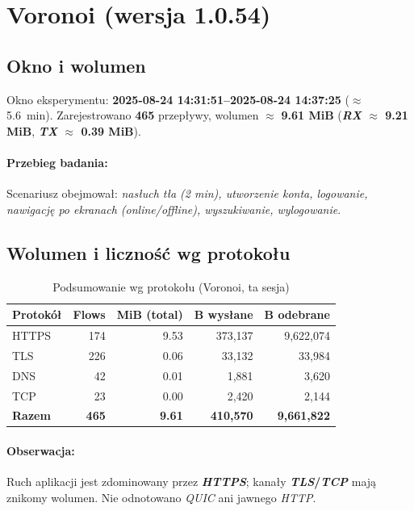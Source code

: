 \section{Voronoi (wersja 1.0.54)}
\label{sec:voronoi}

\subsection*{Okno i wolumen}
Okno eksperymentu: \textbf{2025-08-24 14{:}31{:}51–2025-08-24 14{:}37{:}25} ($\approx$ \SI{5.6}{\minute}). 
Zarejestrowano \textbf{465} przepływy, wolumen $\approx$ \textbf{9.61 MiB} 
(\textbf{\emph{RX} $\approx$ 9.21 MiB}, \textbf{\emph{TX} $\approx$ 0.39 MiB}).

\paragraph{Przebieg badania:} 
Scenariusz obejmował: \emph{nasłuch tła (2 min), utworzenie konta, logowanie, nawigację po ekranach (online/offline), wyszukiwanie, wylogowanie}.

\subsection{Wolumen i liczność wg protokołu}
\begin{table}[H]
  \centering
  \caption{Podsumowanie wg protokołu (Voronoi, ta sesja)}
  \label{tab:voronoi-proto}
  \begin{tabular}{lrrrr}
    \toprule
    \textbf{Protokół} & \textbf{Flows} & \textbf{MiB (total)} & \textbf{B wysłane} & \textbf{B odebrane} \\
    \midrule
    HTTPS & 174 & 9.53 & 373{,}137 & 9{,}622{,}074 \\
    TLS   & 226 & 0.06 & 33{,}132  & 33{,}984 \\
    DNS   & 42  & 0.01 & 1{,}881   & 3{,}620 \\
    TCP   & 23  & 0.00 & 2{,}420   & 2{,}144 \\
    \midrule
    \textbf{Razem} & \textbf{465} & \textbf{9.61} & \textbf{410{,}570} & \textbf{9{,}661{,}822} \\
    \bottomrule
  \end{tabular}
\end{table}

\paragraph{Obserwacja:} 
Ruch aplikacji jest zdominowany przez \textbf{\emph{HTTPS}}; kanały \textbf{\emph{TLS}/\emph{TCP}} mają znikomy wolumen. Nie odnotowano \emph{QUIC} ani jawnego \emph{HTTP}.

